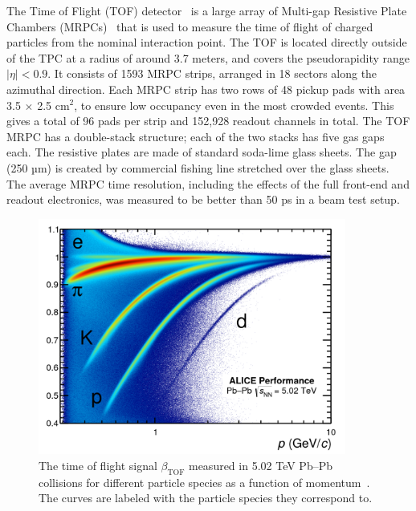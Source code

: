 The Time of Flight (TOF) detector~\cite{TOF1} is a large array of Multi-gap Resistive Plate Chambers (MRPCs)~\cite{TOF2} that is used to measure the time of flight of charged particles from the nominal interaction point. The TOF is located directly outside of the TPC at a radius of around 3.7 meters, and covers the pseudorapidity range $|\eta| < 0.9$. It consists of 1593 MRPC strips, arranged in 18 sectors along the azimuthal direction. Each MRPC strip has two rows of 48 pickup pads with area 3.5 $\times$ 2.5 cm$^2$, to ensure low occupancy even in the most crowded events. This gives a total of 96 pads per strip and 152,928 readout channels in total. The TOF MRPC has a double-stack structure; each of the two stacks has five gas gaps each. The resistive plates are made of standard soda-lime glass sheets. The gap (250 µm) is created by commercial fishing line stretched over the glass sheets. The average MRPC time resolution, including the effects of the full front-end and readout electronics, was measured to be better than 50 ps in a beam test setup.

\begin{figure}
    \centering
    \includegraphics[width=0.9\textwidth]{figures/experiment/tof_pid_curves.png}
    \caption{The time of flight signal $\beta_{\text{TOF}}$ measured in 5.02 TeV Pb--Pb collisions for different particle species as a function of momentum~\cite{TOFPIDPlot}. The curves are labeled with the particle species they correspond to.}
    \label{fig:tof_pid_curves}
\end{figure}

